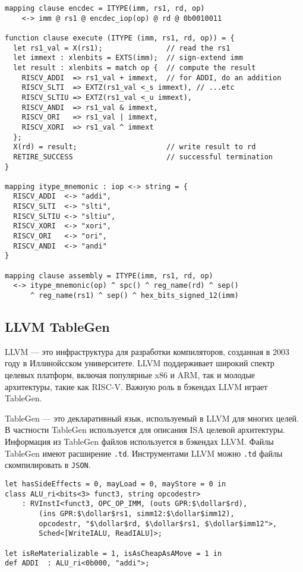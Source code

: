 \begin{lstlisting}[caption={Пример определения семантики исполнения инструкций addi, slti, sltiu, andi, ori, xori на Sail}, language={}, frame=single, label=itype]
mapping clause encdec = ITYPE(imm, rs1, rd, op)
    <-> imm @ rs1 @ encdec_iop(op) @ rd @ 0b0010011

function clause execute (ITYPE (imm, rs1, rd, op)) = {
  let rs1_val = X(rs1);               // read the rs1
  let immext : xlenbits = EXTS(imm);  // sign-extend imm
  let result : xlenbits = match op {  // compute the result
    RISCV_ADDI  => rs1_val + immext,  // for ADDI, do an addition
    RISCV_SLTI  => EXTZ(rs1_val <_s immext), // ...etc
    RISCV_SLTIU => EXTZ(rs1_val <_u immext),
    RISCV_ANDI  => rs1_val & immext,
    RISCV_ORI   => rs1_val | immext,
    RISCV_XORI  => rs1_val ^ immext
  };
  X(rd) = result;                     // write result to rd
  RETIRE_SUCCESS                      // successful termination
}

mapping itype_mnemonic : iop <-> string = {
  RISCV_ADDI  <-> "addi",
  RISCV_SLTI  <-> "slti",
  RISCV_SLTIU <-> "sltiu",
  RISCV_XORI  <-> "xori",
  RISCV_ORI   <-> "ori",
  RISCV_ANDI  <-> "andi"
}

mapping clause assembly = ITYPE(imm, rs1, rd, op)
  <-> itype_mnemonic(op) ^ spc() ^ reg_name(rd) ^ sep()
      ^ reg_name(rs1) ^ sep() ^ hex_bits_signed_12(imm)

\end{lstlisting}

\subsection{LLVM TableGen}

LLVM --- это инфраструктура для разработки компиляторов, созданная в 2003 году в Иллинойсском университете.
LLVM поддерживает широкий спектр целевых платформ, включая популярные x86 и ARM, так и молодые архитектуры, такие как RISC-V.
Важную роль в бэкендах LLVM играет TableGen.

TableGen --- это декларативный язык, используемый в LLVM для многих целей.
В частности TableGen используется для описания ISA целевой архитектуры.
Информация из TableGen файлов используется в бэкендах LLVM.
Файлы TableGen имеют расширение \texttt{.td}.
Инструментами LLVM можно \texttt{.td} файлы скомпилировать в \texttt{JSON}.

\begin{lstlisting}[caption={Описание инструкции addi при помощи TableGen}, language={}, frame=single, mathescape = true]
let hasSideEffects = 0, mayLoad = 0, mayStore = 0 in
class ALU_ri<bits<3> funct3, string opcodestr>
    : RVInstI<funct3, OPC_OP_IMM, (outs GPR:$\dollar$rd),
        (ins GPR:$\dollar$rs1, simm12:$\dollar$imm12),
        opcodestr, "$\dollar$rd, $\dollar$rs1, $\dollar$imm12">,
        Sched<[WriteIALU, ReadIALU]>;

let isReMaterializable = 1, isAsCheapAsAMove = 1 in
def ADDI  : ALU_ri<0b000, "addi">;
\end{lstlisting}

